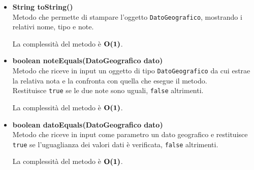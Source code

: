 \documentclass[a4paper, 12pt]{scrreprt}
\begin{document}
\begin{itemize}
				La complessit\`a del metodo \`e $\bigO\textbf{(1)}$.
				\pagebreak
				\item \textbf{String toString()}
				\\Metodo che permette di stampare l'oggetto \verb!DatoGeografico!, mostrando i relativi nome, tipo e note.
				
				La complessit\`a del metodo \`e $\bigO\textbf{(1)}$.
				
				\item \textbf{boolean noteEquals(DatoGeografico dato)}
				\\Metodo che riceve in input un oggetto di tipo \verb!DatoGeografico! da cui estrae la relativa nota e la confronta con quella che esegue il metodo.
				\\Restituisce \verb!true! se le due note sono uguali, \verb!false! altrimenti.
				
				La complessit\`a del metodo \`e $\bigO\textbf{(1)}$.
				
				\item \textbf{boolean datoEquals(DatoGeografico dato)}
				\\Metodo che riceve in input come parametro un dato geografico e restituisce \verb!true! se l'uguaglianza dei valori dati \`e verificata, \verb!false! altrimenti.
				
				La complessit\`a del metodo \`e $\bigO\textbf{(1)}$.
				
			\end{itemize}
\end{document}
